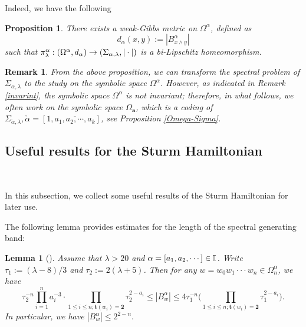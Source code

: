 \documentclass[reqno,11pt,graphicx,]{amsart}
\numberwithin{equation}{section}
\theoremstyle{plain}
\newcommand{\3}{\mathbf{3}}
\newtheorem{proposition}[theorem]{Proposition}
\newtheorem{lemma}[theorem]{Lemma}
\newtheorem{remark}[theorem]{Remark}
\begin{document}
	Indeed, we have the following
	\begin{proposition}\cite[Proposition 5.2]{Qu2018}\label{bi-lip-alpha}
		There exists a weak-Gibbs metric on $\Omega^{\alpha}$, defined as
		\begin{equation*}
			d_{\alpha}(x,y):=|B^{\alpha}_{x\wedge y}|
		\end{equation*}
		such that $\pi^{\alpha}_{\lambda}:(\Omega^{%
			\alpha},d_{\alpha})\to(\Sigma_{\alpha,\lambda},|\cdot|)$ is a bi-Lipschitz homeomorphism. 
	\end{proposition}
	\begin{remark}
		From the above proposition, we can transform the spectral problem of $\Sigma_{\alpha,\lambda}$ to the study on the symbolic space $\Omega^{\alpha}$. However, as indicated in Remark \ref{invarint}, the symbolic space $\Omega^{\alpha}$ is not invariant; therefore, in what follows, we often work on the symbolic space $\Omega_{\mathbf{a}}$, which is a coding of $\Sigma_{\check{\alpha},\lambda},\check{\alpha}=[1,\overline{a_1,a_2,\cdots,a_k}]$, see Proposition \ref{Omega-Sigma}.
	\end{remark}
	\subsection{Useful results for the Sturm Hamiltonian}\
	
	In this subsection, we collect some useful results of the Sturm Hamiltonian for later use.
	
	The following lemma provides estimates for the length of the spectral generating band:
	
	\begin{lemma}[]\label{esti-band-length}
		Assume that $\lambda >20$ and $\alpha =[a_{1},a_{2},\cdots ]\in {\mathbb{%
				I}}$. Write $\tau _{1}:=(\lambda -8)/3$ and $\tau
		_{2}:=2(\lambda +5)$. Then for any $w=w_{0}w_1\cdot \cdot \cdot w_{n}\in \Omega
		_{n}^{\alpha }$, we have 
		\begin{equation*}
			\tau _{2}^{-n}\prod_{i=1}^{n}a_{i}^{-3}\cdot \prod_{1\leq i\leq n;\mathbf{t}(w_{i})=\mathbf{2}}\tau _{2}^{2-a_{i}} \leq |B_{w}^{\alpha }|\leq
			4\tau _{1}^{-n}\Big( \prod_{1\leq i\leq n;\mathbf{t}(w_{i})=\mathbf{2}%
			}\tau _{1}^{2-a_{i}}\Big).
		\end{equation*}
		In particular, we have
		$
		|B_{w}^{\alpha}|\leq2^{2-n}.
		$
	\end{lemma}
	
\end{document}
